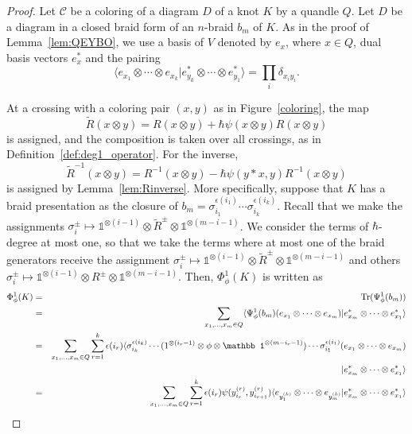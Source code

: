 \documentclass[11pt,fleqn]{amsart} %
\newcommand{\cal}{\mathcal}
\begin{document}
\begin{proof}
Let ${\cal C}$ be a coloring of a diagram $D$ of a knot $K$ by a quandle $Q$. 
 Let $D$ be a diagram in a closed braid form of an $n$-braid $b_m$ of $K$. 
As in the proof of Lemma~\ref{lem:QEYBO}, we use a basis of $V$ denoted by $e_x$, where $x\in Q$, dual basis
vectors  $e_x^*$ and the pairing 
$$\langle e_{x_1}\otimes \cdots \otimes e_{x_k}|e^*_{y_k} \otimes \cdots \otimes e^*_{y_1} \rangle = \prod_i \delta_{x_i y_i}. $$

At a crossing with a coloring pair $(x,y)$ as in Figure~\ref{coloring}, the map 
$$\tilde R (x \otimes y) = R (x \otimes y) + \hbar \psi (x \otimes y)  R (x \otimes y)$$
 is assigned, and the composition is taken 
over all crossings, as in Definition~\ref{def:deg1_operator}.
 For the inverse, 
 $$\tilde R^{-1} (x \otimes y) = R^{-1}  (x \otimes y) - \hbar \psi(y*x, y) R^{-1}   (x \otimes y) $$
  is assigned by Lemma~\ref{lem:Rinverse}. 
More specifically, suppose that $K$ has a braid presentation as the closure of 
 $b_m = \sigma_{i_1}^{\epsilon(i_1)}\cdots \sigma_{i_k}^{\epsilon(i_k)}$. 
Recall that we make  the assignments $\sigma_i^{\pm}  \mapsto \mathbb 1^{\otimes ( i-1 )}\otimes \tilde R^\pm \otimes \mathbb 1^{\otimes (m-i-1)}$. 
We consider the terms of $\hbar$-degree at most one, so that
we take the terms where at most  one of the braid generators receive the assignment 
$\sigma_i^{\pm}  \mapsto \mathbb 1^{\otimes ( i-1)}\otimes \tilde R^\pm \otimes \mathbb 1^{\otimes (m-i-1)}$
and others $\sigma_i^{\pm}  \mapsto \mathbb 1^{\otimes (i-1)}\otimes  R^\pm \otimes \mathbb 1^{\otimes (m-i-1)}$.
	Then, $\Phi^1_\phi(K)$ 
	is written as 
	\begin{eqnarray*}
			\Phi^1_\phi(K) 
			&=& {\rm Tr}(\Psi^1_\phi(b_m))\\
			&=& 
						\sum_{x_1, \ldots, x_m\in Q} \langle \Psi^1_\phi(b_m)(e_{x_1}\otimes \cdots \otimes e_{x_m})|e^*_{x_m}\otimes \cdots \otimes e^*_{x_1}\rangle\\
			&=& 
			\sum_{x_1, \ldots, x_m \in Q}\sum_{r=1}^k \epsilon(i_r)
			 \langle \sigma_{i_k}^{\epsilon(i_k)} \cdots  \mathbb (1^{\otimes (i_r-1) }\otimes \phi \otimes \mathbb 1^{\otimes (m-i_r-1) })  \cdots \sigma_{i_1}^{\epsilon(i_1)}(e_{x_1}\otimes \cdots \otimes e_{x_m})\\
			&&\hspace{3cm} |e^*_{x_m}\otimes \cdots \otimes e^*_{x_1}\rangle\\
	&=&
	\sum_{x_1, \ldots, x_m\in Q}\sum_{r=1}^k \epsilon(i_r)\psi(y^{(r)}_{i_r},y^{(r)}_{i_{r+1}}) \langle e_{y^{(k)}_1}\otimes \cdots \otimes e_{y^{(k)}_m}|e^*_{x_m}\otimes \cdots \otimes e^*_{x_1}\rangle\\

\end{eqnarray*}
\end{proof}
\end{document}
